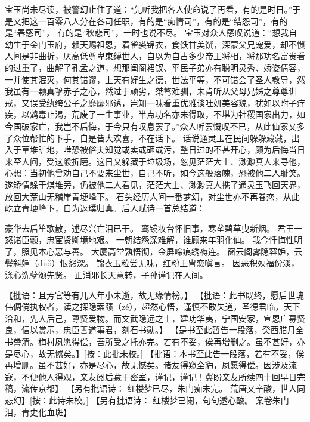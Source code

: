 \documentclass[12pt,oneside]{book}
\begin{document}
宝玉尚未尽读，被警幻止住了道：“先听我把各人使命说了再看，有的是时日。”于是又把这一百零八人分在各司任职，有的是“痴情司”，有的是“结怨司”，有的是“春感司”， 有的是“秋悲司”，一时也说不尽。
宝玉对众人感叹说道：“想我自幼生于金门玉府，赖天赐祖恩，着雀裘锦衣，食饫甘美馔，深蒙父兄宠爱，却不惯人间是非曲折，厌高低尊卑束缚世人，自以为自古多少帝王将相，将那功名富贵看的过重了，曲解了孔孟之道，想那闺阁裙钗、平民子弟亦有聪明灵秀、娇姿倩容，一并使其泯灭，何其错谬，上天有好生之德，世法平等，不可错会了圣人教导，然我虽有一颗真挚赤子之心，然过于顽劣，桀骜难驯，未肯听从父母兄姊之尊尊训戒，又误受纨绔公子之靡靡邪诱，岂知一味看重优雅谈吐妍美容貌，犹如以附子疗疾，以鸩毒止渴，荒废了一生事业，半点功名亦未得取，不堪为社稷国家出力，如今国破家亡，我岂不后悔，于今只有叹息罢了。”众人听罢慨叹不已，从此仙家又多了众位帮忙的下手，自是皆大欢喜，不在话下。
话说通灵玉在民间躲躲藏藏，出入于草堆旷地，唯恐被俗夫知觉或卖或砸或污，整日过的不甚开心，颇为后悔当日来至人间，受这般折磨。这日又躲藏于垃圾场，忽见茫茫大士、渺渺真人来寻他，心想：当初他曾劝自己不要来尘世，自己不听，如今这般落魄，恐被他二人耻笑。遂矫情躲于煤堆旁，仍被他二人看见，茫茫大士、渺渺真人携了通灵玉飞回天界，放回大荒山无稽崖青埂峰下。
石头经历人间一番梦幻，对尘世亦不再眷恋，从此屹立青埂峰下，自为返璞归真。后人赋诗一首总结道：

豪华去后笙歌散，述尽兴亡泪已干。
鸾镜妆台怀旧事，寒垄碧草曳新烟。
君王一怒诸臣颤，忠宦贤卿境地艰。
一朝结怨深难解，谁顾来年羽化仙。
我今忏悔性明了，照见本心恶与善。
大厦高堂孰悟彻，金屏啼痕绣褥连。
窗云阁雾隐容妒，云鬓斜軃（duǒ）恨怨深。
锦衣玉粒尝无味，红粉王胄恋嗔言。
因恶积殃福份淡，涤心洗孽颂先贤。
正消邪长天意转，子孙谨记在人间。

【批语：且芳官等有几人年小未逝，故无缘情榜。】
【批语：此书既终，愿后世瑰伟倜傥执权者，读之探隐索赜（zé），超然心悟，谨慎不敢失道，圣德君临，天下洽和，先人后己，尊贤爱物。而文武隐远之士，建功华夷，宁国安家，宣恩广募贤良，信以赏示，忠臣善道事君，刻石书勋。】
【是书至此暂告一段落，癸酉腊月全书誊清。梅村夙愿得偿，吾所受之托亦完。若有不妥，俟再增删之。虽不甚好，亦是尽心，故无憾矣。】[按：此批未校。]
【批语：本书至此告一段落，若有不妥，俟再增删。虽不甚好，亦是尽心，故无憾矣。诸友得窥全豹，夙愿得偿。因涉及流寇，不便他人得观，亲友阅后藏于密室，谨记，谨记！冀盼亲友所续四十回早日完稿，流传京都】
【另有批语诗：
红楼梦已尽，朱门痴未完。
荒唐又辛酸，世人同悲幻】[按：此诗未校。]
【另有批语诗：
红楼梦已阑，句句透心酸。
案卷朱门泪，青史化血斑】
\end{document}
